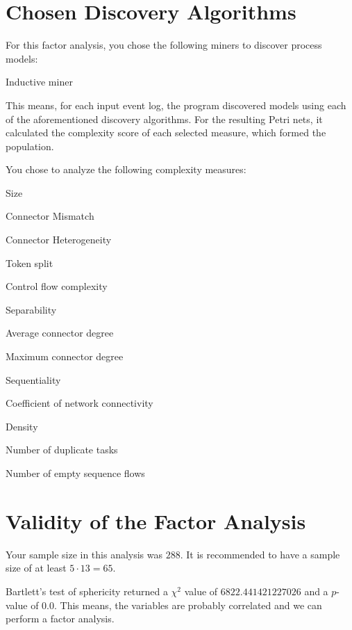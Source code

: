\documentclass[a4paper]{article}
\begin{document}
\section*{Chosen Discovery Algorithms}
For this factor analysis, you chose the following miners to discover process models:
\begin{compactitem}
\item Inductive miner
\end{compactitem}

This means, for each input event log, the program discovered models using each of the aforementioned discovery algorithms.
For the resulting Petri nets, it calculated the complexity score of each selected measure, which formed the population.

You chose to analyze the following complexity measures:
\begin{compactitem}
\item Size
\item Connector Mismatch
\item Connector Heterogeneity
\item Token split
\item Control flow complexity
\item Separability
\item Average connector degree
\item Maximum connector degree
\item Sequentiality
\item Coefficient of network connectivity
\item Density
\item Number of duplicate tasks
\item Number of empty sequence flows
\end{compactitem}

\section*{Validity of the Factor Analysis}
Your sample size in this analysis was $288$.
It is recommended to have a sample size of at least $5 \cdot 13 = 65$.

Bartlett's test of sphericity returned a $\chi^2$ value of $6822.441421227026$ and a $p$-value of $0.0$.
This means, the variables are probably correlated and we can perform a factor analysis.
\end{document}
